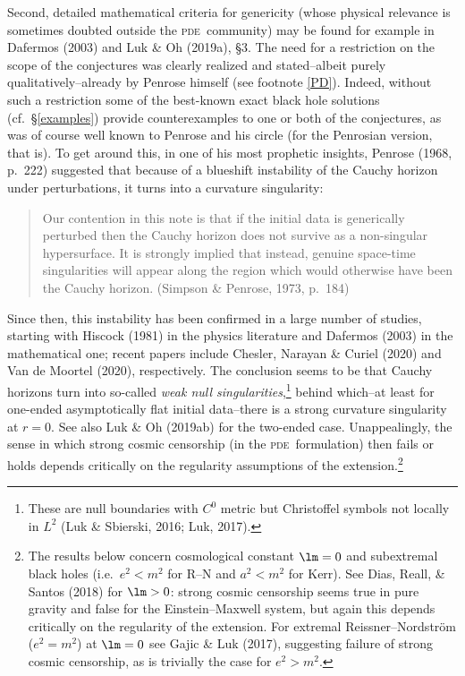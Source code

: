 \documentclass[12pt]{article}
\newcommand{\pde}{\textsc{pde}}
\begin{document}
Second, detailed mathematical criteria for genericity (whose physical relevance is sometimes doubted outside the \pde\ community) may be found for example in Dafermos (2003) and 
Luk \& Oh (2019a), \S 3. The need for 
a restriction on the scope of the conjectures was clearly realized and stated--albeit purely qualitatively--already by Penrose himself (see footnote \ref{PD}). 
Indeed,  without such a restriction some of the best-known exact black hole solutions (cf.\ \S\ref{examples})  provide  counterexamples to one or both of the conjectures, as was of course well known to Penrose and his circle (for the Penrosian version, that is).
To get around this,
in one of his most prophetic insights, 
Penrose (1968, p.\ 222) suggested that  because of a blueshift instability of the Cauchy horizon under perturbations,  it  turns into a curvature singularity:
\begin{quote}
\begin{small}
Our contention in this note is that if the initial data is generically perturbed then the Cauchy horizon does not survive as a non-singular hypersurface. It is strongly implied that instead, genuine space-time singularities will appear along the region which would otherwise have been the Cauchy horizon. (Simpson \& Penrose, 1973, p.\ 184)
\end{small}
\end{quote}
Since then, this  instability has  been confirmed in a large number of studies, starting with Hiscock (1981) in the physics literature and  Dafermos (2003) in the  mathematical one; recent papers include Chesler,   Narayan \&  Curiel (2020)  and Van de Moortel (2020), respectively.
 The conclusion seems to be that Cauchy horizons turn into so-called \emph{weak null singularities},\footnote{These are null boundaries with $C^0$  metric  but  Christoffel symbols not locally in $L^2$ (Luk \& Sbierski, 2016; Luk, 2017).}
  behind which--at least for one-ended asymptotically flat initial data--there is a strong curvature singularity at $r=0$. See also Luk \& Oh (2019ab) for the two-ended case. Unappealingly,
  the sense in which strong cosmic censorship (in the \pde\ formulation) then fails or holds depends critically on the regularity assumptions of the extension.\footnote{The results below concern cosmological constant  $\lm=0$ and subextremal black holes (i.e.\ $e^2<m^2$ for R--N and $a^2<m^2$ for Kerr). 
  See Dias, Reall, \& Santos (2018) for   $\lm>0$:  strong cosmic censorship seems true in pure gravity and false for the Einstein--Maxwell system, but again this  depends critically on the regularity of the extension. For extremal Reissner--Nordstr\"{o}m ($e^2=m^2$) at $\lm=0$ see Gajic \& Luk (2017), suggesting failure of strong cosmic censorship, as is trivially the case for $e^2>m^2$.} 
  
\end{document}

